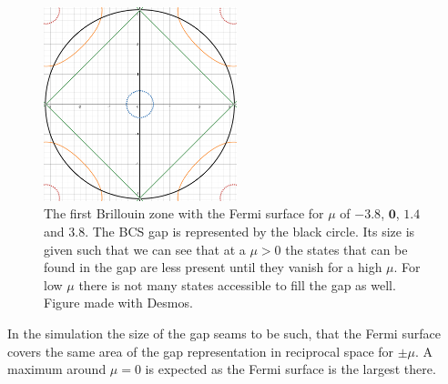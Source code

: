\documentclass[..\main.tex]{subfile}
\begin{document}
\begin{figure}[H]
  \centering
  \includegraphics[width=0.5\textwidth]{Ressources/GapBrillouin.png}
  \caption{The first Brillouin zone with the Fermi surface for $\mu$ of \textcolor{Brillou1}{$\bm{-3.8}$}, \textcolor{Brillou2}{$\bm{0}$},
  \textcolor{Brillou3}{$\bm{1.4}$} and \textcolor{Brillou4}{$\bm{3.8}$}. The BCS gap is represented by the black circle. Its size is given such that 
  we can see that at a $\mu>0$ the states that can be found in the gap are less present until they vanish for a high $\mu$. For low $\mu$ there is
  not many states accessible to fill the gap as well. Figure made with Desmos.}
  \label{fig:Brillouin}
\end{figure}
In the simulation the size of the gap seams to be such, that the Fermi surface 
covers the same area of the gap representation in reciprocal space for $\pm\mu$.
A maximum around $\mu=0$ is expected as the Fermi surface is the largest there.   
\end{document}
